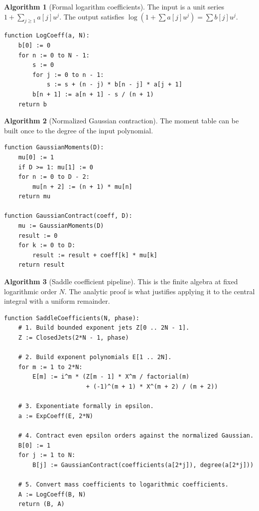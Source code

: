 \documentclass[11pt,oneside]{article}
\theoremstyle{definition}
\newtheorem{algorithm}[algorithm]{Algorithm}
\theoremstyle{remark}
\begin{document}
\begin{algorithm}[Formal logarithm coefficients]
\label{integration:alg:logcoeff}
The input is a unit series $1+\sum_{j\ge1}a[j]u^j$.  The output satisfies
$\log(1+\sum a[j]u^j)=\sum b[j]u^j$.
\end{algorithm}
\begin{lstlisting}[style=pseudo]
function LogCoeff(a, N):
    b[0] := 0
    for n := 0 to N - 1:
        s := 0
        for j := 0 to n - 1:
            s := s + (n - j) * b[n - j] * a[j + 1]
        b[n + 1] := a[n + 1] - s / (n + 1)
    return b
\end{lstlisting}

\begin{algorithm}[Normalized Gaussian contraction]
\label{integration:alg:gaussian-contraction}
The moment table can be built once to the degree of the input polynomial.
\end{algorithm}
\begin{lstlisting}[style=pseudo]
function GaussianMoments(D):
    mu[0] := 1
    if D >= 1: mu[1] := 0
    for n := 0 to D - 2:
        mu[n + 2] := (n + 1) * mu[n]
    return mu

function GaussianContract(coeff, D):
    mu := GaussianMoments(D)
    result := 0
    for k := 0 to D:
        result := result + coeff[k] * mu[k]
    return result
\end{lstlisting}

\begin{algorithm}[Saddle coefficient pipeline]
\label{integration:alg:saddle-pipeline}
This is the finite algebra at fixed logarithmic order $N$.  The analytic proof is what
justifies applying it to the central integral with a uniform remainder.
\end{algorithm}
\begin{lstlisting}[style=pseudo]
function SaddleCoefficients(N, phase):
    # 1. Build bounded exponent jets Z[0 .. 2N - 1].
    Z := ClosedJets(2*N - 1, phase)

    # 2. Build exponent polynomials E[1 .. 2N].
    for m := 1 to 2*N:
        E[m] := i^m * (Z[m - 1] * X^m / factorial(m)
                       + (-1)^(m + 1) * X^(m + 2) / (m + 2))

    # 3. Exponentiate formally in epsilon.
    a := ExpCoeff(E, 2*N)

    # 4. Contract even epsilon orders against the normalized Gaussian.
    B[0] := 1
    for j := 1 to N:
        B[j] := GaussianContract(coefficients(a[2*j]), degree(a[2*j]))

    # 5. Convert mass coefficients to logarithmic coefficients.
    A := LogCoeff(B, N)
    return (B, A)
\end{lstlisting}
\end{document}
